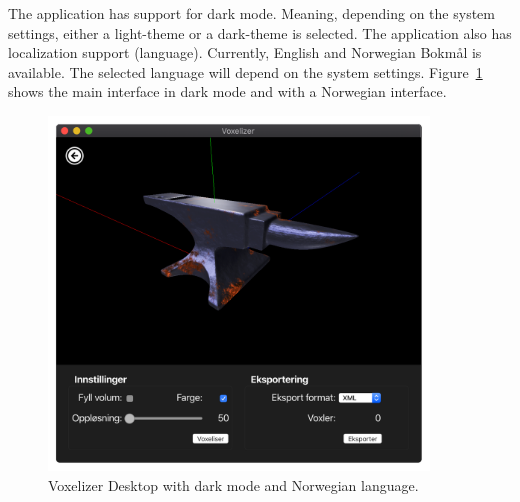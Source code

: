 The application has support for dark mode. Meaning, depending on the system settings, either a light-theme or a dark-theme is selected. The application also has localization support (language). Currently, English and Norwegian Bokmål is available. The selected language will depend on the system settings. Figure~\ref{fig:voxelizer-desktop-gui-main-dark} shows the main interface in dark mode and with a Norwegian interface.
\begin{figure}[htp]
    \centering
    \includegraphics[width=0.9\textwidth]{sections/result/figures/voxelizer-desktop-gui-main-dark.png}
    \caption{Voxelizer Desktop with dark mode and Norwegian language.}
    \label{fig:voxelizer-desktop-gui-main-dark}
\end{figure}
\clearpage

